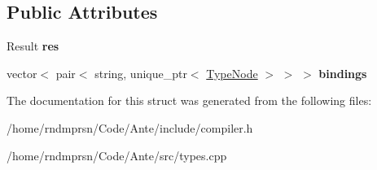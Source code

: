 \subsection*{Public Attributes}
\begin{DoxyCompactItemize}
\item 
\mbox{\label{structTypeCheckResult_ab2e78473529f9ce8f70bc0faae4e2b6c}} 
Result {\bfseries res}
\item 
\mbox{\label{structTypeCheckResult_a3983f128bd275f5aa169bba558fae6b0}} 
vector$<$ pair$<$ string, unique\+\_\+ptr$<$ \hyperlink{structTypeNode}{Type\+Node} $>$ $>$ $>$ {\bfseries bindings}
\end{DoxyCompactItemize}


The documentation for this struct was generated from the following files\+:\begin{DoxyCompactItemize}
\item 
/home/rndmprsn/\+Code/\+Ante/include/compiler.\+h\item 
/home/rndmprsn/\+Code/\+Ante/src/types.\+cpp\end{DoxyCompactItemize}
